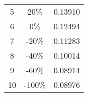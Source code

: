 \begin{longtable}[c]{ccc}
    5                                                                             & 20\%                                                                                & 0.13910                                                        \\
    6                                                                             & {\color[HTML]{FE0000} 0\%}                                                          & 0.12494                                                        \\
    7                                                                             & {\color[HTML]{FE0000} -20\%}                                                        & 0.11283                                                        \\
    8                                                                             & {\color[HTML]{FE0000} -40\%}                                                        & 0.10014                                                        \\
    9                                                                             & {\color[HTML]{FE0000} -60\%}                                                        & 0.08914                                                        \\
    10                                                                            & {\color[HTML]{FE0000} -100\%}                                                       & 0.08976                                                        \\ \hline
\end{longtable}